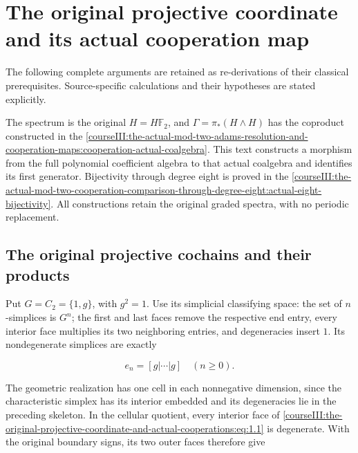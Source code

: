 \section{The original projective coordinate and its actual cooperation map}\label{courseIII:the-original-projective-coordinate-and-actual-cooperations:section}

The following complete arguments are retained as re-derivations of their classical prerequisites. Source-specific calculations and their hypotheses are stated explicitly.

The spectrum is the original \(H=H\mathbb F_2\), and \(\Gamma=\pi_*(H\wedge H)\) has the coproduct constructed in the \cref{courseIII:the-actual-mod-two-adams-resolution-and-cooperation-maps:cooperation-actual-coalgebra}. This text constructs a morphism from the full polynomial coefficient algebra to that actual coalgebra and identifies its first generator. Bijectivity through degree eight is proved in the \cref{courseIII:the-actual-mod-two-cooperation-comparison-through-degree-eight:actual-eight-bijectivity}. All constructions retain the original graded spectra, with no periodic replacement.

\subsection{The original projective cochains and their products}
\label{courseIII:the-original-projective-coordinate-and-actual-cooperations:projective-original-cochains}

\label{courseIII:the-original-projective-coordinate-and-actual-cooperations:section-1}\label{courseIII:projective-coop:1}

Put \(G=C_2=\{1,g\}\), with \(g^2=1\). Use its simplicial classifying space: the set of \(n\)-simplices is \(G^n\); the first and last faces remove the respective end entry, every interior face multiplies its two neighboring entries, and degeneracies insert \(1\). Its nondegenerate simplices are exactly

\begin{equation}
e_n=[g|\cdots|g]\quad(n\geq0).
 \label{courseIII:the-original-projective-coordinate-and-actual-cooperations:eq:1.1}
\end{equation}

The geometric realization has one cell in each nonnegative dimension, since the characteristic simplex has its interior embedded and its degeneracies lie in the preceding skeleton. In the cellular quotient, every interior face of \eqref{courseIII:the-original-projective-coordinate-and-actual-cooperations:eq:1.1} is degenerate. With the original boundary signs, its two outer faces therefore give

